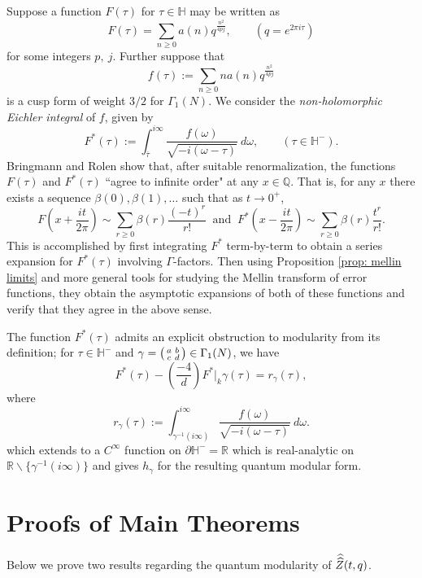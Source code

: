 \documentclass[11pt,letterpaper]{amsart}
\theoremstyle{definition}
\theoremstyle{plain}
\newcommand{\Zhathat}{\widehat{\vphantom{\rule{5pt}{10pt}}\smash{\widehat{Z}}\,}\!}
\numberwithin{equation}{section}
\theoremstyle{example}
\begin{document}
Suppose a function $F(\tau)$ for $\tau \in \mathbb{H}$ may be written as
\[F(\tau) = \sum_{n \geq 0} a(n) q^\frac{n^2}{4pj}, \quad \quad (q=e^{2\pi i \tau})
\]
for some integers $p, \ j$. Further suppose that
\[f(\tau):= \sum_{n \geq 0} n a(n) q^\frac{n^2}{4pj}
\]
is a cusp form of weight $3/2$ for $\Gamma_1(N)$.  
We consider the \textit{non-holomorphic Eichler integral} of $f$, given by 
\[F^*(\tau):= \int_{\overline{\tau}}^{i\infty} \frac{f(\omega)}{\sqrt{-i(\omega-\tau)}} \ d\omega, \quad \quad (\tau \in \mathbb{H}^-).
\]
Bringmann and Rolen show that, after suitable renormalization, the functions $F(\tau)$ and $F^*(\tau)$ ``agree to infinite order" at any $x \in \mathbb{Q}$. That is, for any $x$ there exists a sequence $\beta(0), \beta(1), \dots$ such that as $t \to 0^+$, 
\[F\left(x+\frac{it}{2\pi}\right) \sim \sum_{r \geq 0} \beta(r) \frac{(-t)^r}{r!} \ \text{ and } \ F^*\left(x-\frac{it}{2\pi}\right) \sim \sum_{r \geq 0} \beta(r) \frac{t^r}{r!}.\]
This is accomplished by first integrating $F^*$ term-by-term to obtain a series expansion for $F^*(\tau)$ involving $\Gamma$-factors. Then using Proposition \ref{prop: mellin limits} and more general tools for studying the Mellin transform of error functions, they obtain the asymptotic expansions of both of these functions and verify that they agree in the above sense.

The function $F^*(\tau)$ admits an explicit obstruction to modularity from its definition; for $\tau \in \mathbb{H}^-$ and $\gamma = \begin{psmallmatrix} a & b \\ c & d \end{psmallmatrix} \in \Gamma_1(N)$, we have
\[F^*(\tau) - \textstyle{\left(\frac{-4}{d}\right)}F^*|_k\gamma \left(\tau\right)= r_\gamma(\tau),
\]
where 
\[r_{\gamma}(\tau):= \int_{\gamma^{-1}(i\infty)}^{i \infty}\frac{f(\omega)}{\sqrt{-i(\omega-\tau)}} \ d\omega.
\]
which extends to a $C^\infty$ function on $\partial \mathbb{H}^- = \mathbb{R}$ which is real-analytic on $\mathbb{R}\backslash \{\gamma^{-1}(i\infty)\}$
and gives $h_\gamma$ for the resulting quantum modular form.

\section{Proofs of Main Theorems \label{sec: modularity proof}}
Below we prove two results regarding the quantum modularity of $\Zhathat(t,q)$.
\end{document}
